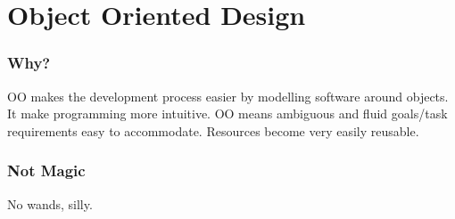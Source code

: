 \section{Object Oriented Design}
	\subsubsection{Why?}
		OO makes the development process easier by modelling software around objects.
		It make programming more intuitive.
		OO means ambiguous and fluid goals/task requirements easy to accommodate.
		Resources become very easily reusable.
	\subsubsection{Not Magic}
		No wands, silly.
